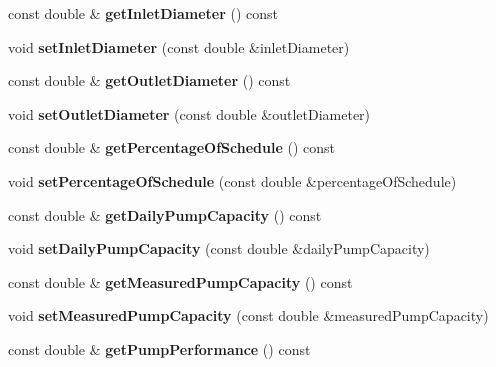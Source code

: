 \begin{DoxyCompactItemize}
const double \& {\bfseries get\+Inlet\+Diameter} () const
\item 
\mbox{\label{class_pump_data_a8aae1ff5b0a23ef9f9c3edcd40657a9f}} 
void {\bfseries set\+Inlet\+Diameter} (const double \&inlet\+Diameter)
\item 
\mbox{\label{class_pump_data_af54820800daf7cdbc66e9bf53d9cafbc}} 
const double \& {\bfseries get\+Outlet\+Diameter} () const
\item 
\mbox{\label{class_pump_data_a9add2f19a04456530c1b5d1564b20684}} 
void {\bfseries set\+Outlet\+Diameter} (const double \&outlet\+Diameter)
\item 
\mbox{\label{class_pump_data_a95d0258d03ac3bcd04b740112d3840d3}} 
const double \& {\bfseries get\+Percentage\+Of\+Schedule} () const
\item 
\mbox{\label{class_pump_data_ac3e2c4f36a0373e3f0b9385ba39a8538}} 
void {\bfseries set\+Percentage\+Of\+Schedule} (const double \&percentage\+Of\+Schedule)
\item 
\mbox{\label{class_pump_data_a4e01ef865da218d4439203fe08706c96}} 
const double \& {\bfseries get\+Daily\+Pump\+Capacity} () const
\item 
\mbox{\label{class_pump_data_a89efc6467e866a8746aaa0ece660a760}} 
void {\bfseries set\+Daily\+Pump\+Capacity} (const double \&daily\+Pump\+Capacity)
\item 
\mbox{\label{class_pump_data_aaeec98b8d4cb32520105f1ab980ada0f}} 
const double \& {\bfseries get\+Measured\+Pump\+Capacity} () const
\item 
\mbox{\label{class_pump_data_a8c2cdd2e403d008195e4dc4162d3fc39}} 
void {\bfseries set\+Measured\+Pump\+Capacity} (const double \&measured\+Pump\+Capacity)
\item 
\mbox{\label{class_pump_data_a32c1b445d7e25ad89529a08dcf2e2f92}} 
const double \& {\bfseries get\+Pump\+Performance} () const
\item 
\mbox{\label{class_pump_data_a6cddba8e1e57361dca2dce4dea0dc007}} 

\end{DoxyCompactItemize}
